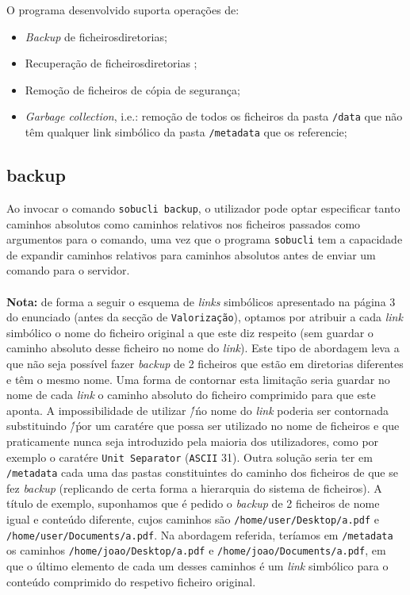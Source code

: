 \documentclass[a4paper,12pt,titlepage,draft,portuguese]{article}
\begin{document}
O programa desenvolvido suporta operações de:

	\begin{itemize}
		\item \emph{Backup} de ficheiros\/diretorias;
		\item Recuperação de ficheiros\/diretorias ;
		\item Remoção de ficheiros de cópia de segurança;
		\item \emph{Garbage collection}, i.e.: remoção de todos os ficheiros da pasta \texttt{/data} que não têm qualquer link simbólico da pasta \texttt{/metadata} que os referencie;
	\end{itemize}

\subsection{backup}

Ao invocar o comando \texttt{sobucli backup}, o utilizador pode optar especificar tanto caminhos absolutos como caminhos relativos nos ficheiros passados como argumentos para o comando, uma vez que o programa \texttt{sobucli} tem a capacidade de expandir caminhos relativos para caminhos absolutos antes de enviar um comando para o servidor.\\\\\textbf{Nota:} de forma a seguir o esquema de \emph{links} simbólicos apresentado na página 3 do enunciado (antes da secção de \texttt{Valorização}), optamos por atribuir a cada \emph{link} simbólico o nome do ficheiro original a que este diz respeito (sem guardar o caminho absoluto desse ficheiro no nome do \emph{link}). Este tipo de abordagem leva a que não seja possível fazer \emph{backup} de 2 ficheiros que estão em diretorias diferentes e têm o mesmo nome. Uma forma de contornar esta limitação seria guardar no nome de cada \emph{link} o caminho absoluto do ficheiro comprimido para que este aponta. A impossibilidade de utilizar \'/\' no nome do \emph{link} poderia ser contornada substituindo \'/\' por um caratére que possa ser utilizado no nome de ficheiros e que praticamente nunca seja introduzido pela maioria dos utilizadores, como por exemplo o caratére \texttt{Unit Separator} (\texttt{ASCII} 31). Outra solução seria ter em \texttt{/metadata} cada uma das pastas constituintes do caminho dos ficheiros de que se fez \emph{backup} (replicando de certa forma a hierarquia do sistema de ficheiros). A título de exemplo, suponhamos que é pedido o \emph{backup} de 2 ficheiros de nome igual e conteúdo diferente, cujos caminhos são \texttt{/home/user/Desktop/a.pdf} e \texttt{/home/user/Documents/a.pdf}. Na abordagem referida, teríamos em \texttt{/metadata} os caminhos \texttt{/home/joao/Desktop/a.pdf} e \texttt{/home/joao/Documents/a.pdf}, em que o último elemento de cada um desses caminhos é um \emph{link} simbólico para o conteúdo comprimido do respetivo ficheiro original.
\end{document}
